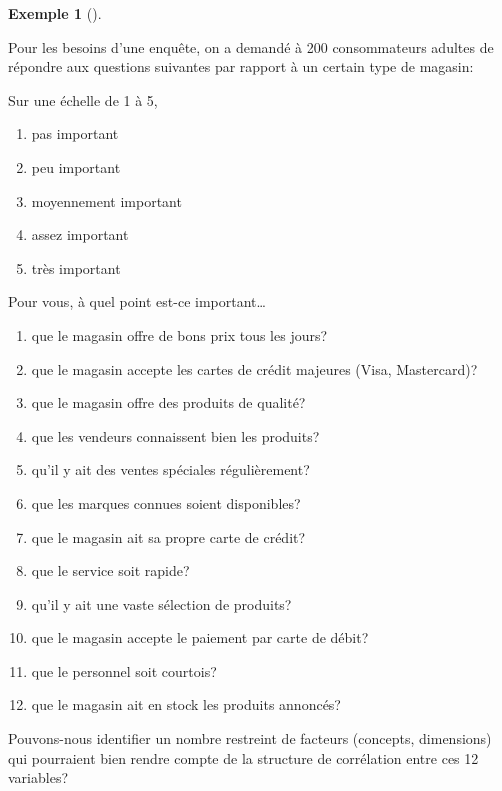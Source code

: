 \documentclass[
  11pt,
  letterpaper,
]{scrbook}
\providecommand{\tightlist}{%
  \setlength{\itemsep}{0pt}\setlength{\parskip}{0pt}}\usepackage{longtable,booktabs,array}
\theoremstyle{definition}
\newtheorem{example}{Exemple}[chapter]
\theoremstyle{remark}
\begin{document}
\begin{example}[]\protect\hypertarget{exm-facto}{}\label{exm-facto}

Pour les besoins d'une enquête, on a demandé à 200 consommateurs adultes
de répondre aux questions suivantes par rapport à un certain type de
magasin:

Sur une échelle de 1 à 5,

\begin{enumerate}
\def\labelenumi{\arabic{enumi}.}
\tightlist
\item
  pas important
\item
  peu important
\item
  moyennement important
\item
  assez important
\item
  très important
\end{enumerate}

Pour vous, à quel point est-ce important\ldots

\begin{enumerate}
\def\labelenumi{\arabic{enumi}.}
\tightlist
\item
  que le magasin offre de bons prix tous les jours?
\item
  que le magasin accepte les cartes de crédit majeures (Visa,
  Mastercard)?
\item
  que le magasin offre des produits de qualité?
\item
  que les vendeurs connaissent bien les produits?
\item
  qu'il y ait des ventes spéciales régulièrement?
\item
  que les marques connues soient disponibles?
\item
  que le magasin ait sa propre carte de crédit?
\item
  que le service soit rapide?
\item
  qu'il y ait une vaste sélection de produits?
\item
  que le magasin accepte le paiement par carte de débit?
\item
  que le personnel soit courtois?
\item
  que le magasin ait en stock les produits annoncés?
\end{enumerate}

Pouvons-nous identifier un nombre restreint de facteurs (concepts,
dimensions) qui pourraient bien rendre compte de la structure de
corrélation entre ces 12 variables?

\end{example}
\end{document}
